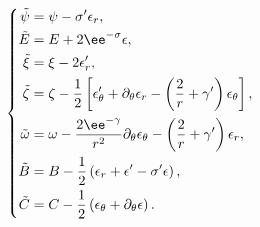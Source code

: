 \begin{equation}
\left\{
\begin{aligned}
\tilde{\psi} & = \psi - \sigma' \epsilon_r,\\
\tilde E &= E + 2 \ee^{-\sigma} \epsilon ,\\
\tilde\xi &= \xi - 2 \epsilon_r',\\
 \tilde \zeta &= \zeta -
\frac{1}{2} \left[\epsilon_\theta' +\partial_\theta
\epsilon_r - \left(\displaystyle{2\over r}+\gamma'\right)
\epsilon_\theta \right],\\
 \tilde\omega &= \omega
- {2\ee^{-\gamma} \over r^2} \partial_\theta\epsilon_\theta -
\left({2\over r}+\gamma'\right)\epsilon_r,\\
\tilde B &= B -  {1\over 2} \left( \epsilon_r + \epsilon'-\sigma'
\epsilon \right),\\
\tilde C &= C - \displaystyle {1\over 2} \left( \epsilon_\theta +
\partial_\theta \epsilon \right).
\end{aligned}
\right.
\end{equation}


